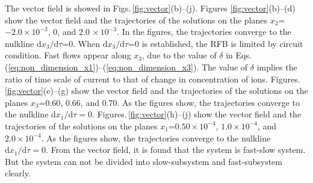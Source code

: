 \documentclass[a4paper]{article}
\newcommand{\eqshref}[2]{Eqs.\,(\ref{#1})--(\ref{#2})}
\newcommand{\mfigshref}[3]{Figs.\,\ref{#1}(#2)--(#3)}
\newcommand{\ifigsref}[1]{Figures.\,\ref{#1}}
\newcommand{\order}[1]{\times10^{#1}}
\newcommand{\dd}[2]{\mathrm{d}#1/\mathrm{d}#2}
\begin{document}
The vector field is showed in \mfigshref{fig:vector}{b}{j}. Figures \ref{fig:vector}(b)--(d) show 
the vector field 
and the trajectories of the solutions 
on the planes $x_2$=$-2.0\order{-3}$, $0$, and $2.0\,\order{-3}$. 
In the figures, 
the trajectories converge to the nulkline $\dd{x_3}{\tau}$=$0$. 
When $\dd{x_3}{\tau}$=$0$ is established,
the RFB is limited by circuit condition. 
Fast flows appear along $x_3$,
due to the value of $\delta$ in \eqshref{eq:non_dimension_x1}{eq:non_dimension_x3}. 
The value of $\delta$ implies the ratio of time scale of current to that of change in concentration of ions. 
\ifigsref{fig:vector}(e)--(g) show the vector field and the trajectories of the solutions 
on the planes $x_3$=$0.60$, $0.66$, and $0.70$. 
As the figures show, the trajectories converge to the nulkline $\dd{x_1}{\tau}=0$.
\ifigsref{fig:vector}(h)--(j) show the vector field and the trajectories of the solutions 
on the planes $x_1$=$0.50\order{-4}$, $1.0\order{-4}$, and $2.0\order{-4}$. 
As the figures show, the trajectories converge to the nulkline $\dd{x_1}{\tau}=0$.
From the vector field,
it is found that
the system is fast-slow system.
But the system can not be divided into slow-subsystem and fast-subsystem clearly. 
\end{document}
